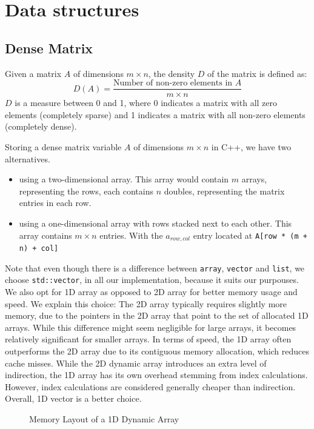 \section{Data structures}

\subsection{Dense Matrix}
Given a matrix \( A \) of dimensions \( m \times n \), the density \( D \) of
the matrix is defined as:
\[
    D(A) = \frac{\text{Number of non-zero elements in } A}{m \times n}
\]
$D$ is a measure between 0 and 1, where 0 indicates a
matrix with all zero elements (completely sparse)
and 1 indicates a matrix with all non-zero elements (completely dense).

Storing a dense matrix variable \( A \) of dimensions \( m \times n \) in C++, we have two alternatives.
\begin{itemize}
    \item using a two-dimensional array. This array would contain
          $m$ arrays, representing the rows, each contains $n$ doubles, representing the matrix entries in each row.
    \item using a one-dimensional array with rows stacked next to each other.
          This array contains $m \times n$ entries.
          With the $a_{row,col}$ entry located at \texttt{A[row * (m + n) + col]}
\end{itemize}
Note that even
though there is a difference between  \texttt{array}, \texttt{vector} and \texttt{list}, we
choose \texttt{std::vector}, in all our implementation, because it suits our purpouses.
We also opt for 1D array as opposed to 2D array for better memory usage and speed.
We explain this choice:
The 2D array typically requires slightly more memory, due to the pointers in the 2D array that point to
the set of allocated 1D arrays. While this difference might seem negligible for large arrays,
it becomes relatively significant for smaller arrays.
In terms of speed, the 1D array often outperforms
the 2D array due to its contiguous memory allocation, which reduces cache misses.
While the 2D dynamic array introduces an
extra level of indirection, the 1D array has its own overhead stemming from index calculations.
However, index calculations are considered generally cheaper than indirection.
Overall, 1D vector is a better choice.

\begin{figure}[h]
    \centering
    \caption{Memory Layout of a 1D Dynamic Array}
\end{figure}

